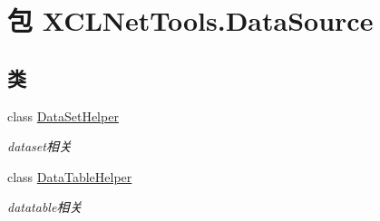\hypertarget{namespace_x_c_l_net_tools_1_1_data_source}{\section{包 X\-C\-L\-Net\-Tools.\-Data\-Source}
\label{namespace_x_c_l_net_tools_1_1_data_source}
}
\subsection*{类}
\begin{DoxyCompactItemize}
\item 
class \hyperlink{class_x_c_l_net_tools_1_1_data_source_1_1_data_set_helper}{Data\-Set\-Helper}
\begin{DoxyCompactList}\small\item\em dataset相关 \end{DoxyCompactList}\item 
class \hyperlink{class_x_c_l_net_tools_1_1_data_source_1_1_data_table_helper}{Data\-Table\-Helper}
\begin{DoxyCompactList}\small\item\em datatable相关 \end{DoxyCompactList}\end{DoxyCompactItemize}

